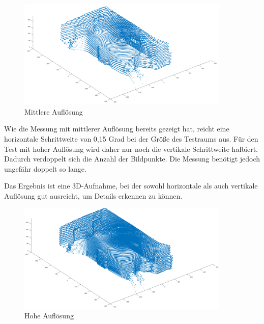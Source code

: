 \begin{figure}[H]
	\centering
	\includegraphics[width=0.9\textwidth]{images/Validierung/Aufloesungen/mittel.png}
	\caption{Mittlere Auflösung}
	\label{mittel}
\end{figure}

Wie die Messung mit mittlerer Auflösung bereits gezeigt hat, reicht eine horizontale Schrittweite von 0,15 Grad bei der Größe des Testraums aus. Für den Test mit hoher Auflösung wird daher nur noch die vertikale Schrittweite halbiert. Dadurch verdoppelt sich die Anzahl der Bildpunkte. Die Messung benötigt jedoch ungefähr doppelt so lange.

Das Ergebnis ist eine 3D-Aufnahme, bei der sowohl horizontale als auch vertikale Auflösung gut ausreicht, um Details erkennen zu können.

\begin{figure}[H]
	\centering
	\includegraphics[width=0.9\textwidth]{images/Validierung/Aufloesungen/hoch.png}
	\caption{Hohe Auflösung}
	\label{hoch}
\end{figure}




